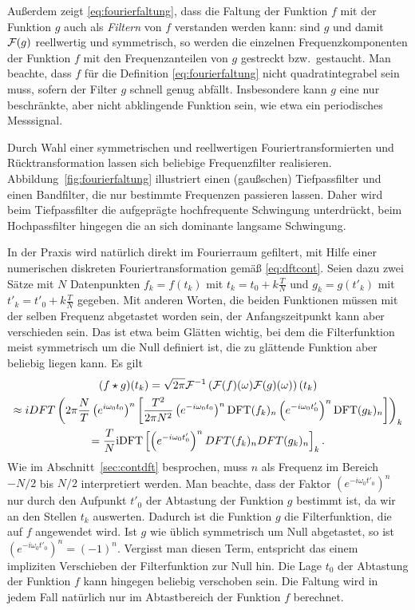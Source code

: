 Außerdem zeigt \eqref{eq:fourierfaltung}, dass die Faltung der Funktion
$f$ mit der Funktion $g$ auch als \emph{Filtern} von $f$ verstanden
werden kann:
sind $g$ und damit $\mathcal F(g)$ reellwertig und symmetrisch, so werden die
einzelnen Frequenzkomponenten der Funktion $f$ mit den
Frequenzanteilen von $g$ gestreckt bzw.\ gestaucht. Man beachte, dass $f$
für die Definition
\eqref{eq:fourierfaltung} nicht quadratintegrabel sein muss, sofern
der Filter $g$ schnell genug abfällt. Insbesondere kann $g$ eine nur
beschränkte, aber nicht abklingende Funktion sein, wie etwa ein periodisches
Messsignal.

Durch Wahl einer symmetrischen und reellwertigen
Fouriertransformierten und Rücktransformation lassen sich
beliebige Frequenzfilter realisieren. Abbildung~\ref{fig:fourierfaltung}
illustriert einen (gaußschen) Tiefpassfilter und einen Bandfilter, die
nur bestimmte Frequenzen passieren lassen. Daher wird beim
Tiefpassfilter die aufgeprägte hochfrequente Schwingung unterdrückt,
beim Hochpassfilter hingegen die an sich dominante langsame
Schwingung.

In der Praxis wird natürlich direkt im Fourierraum gefiltert, mit Hilfe einer
numerischen diskreten Fouriertransformation gemäß \eqref{eq:dftcont}. Seien dazu zwei Sätze mit $N$ Datenpunkten $f_k =
f(t_k)$  mit $t_k = t_0 + k\frac{T}{N}$  und $g_k = g(t'_k) $ mit
$t'_k = t'_0 + k\frac{T}{N}$ gegeben. Mit anderen Worten, die beiden
Funktionen müssen mit der selben Frequenz abgetastet worden sein, der
Anfangszeitpunkt kann aber verschieden sein. Das ist etwa beim
Glätten wichtig, bei dem die Filterfunktion meist symmetrisch um die
Null definiert ist, die zu glättende Funktion aber beliebig liegen
kann. Es gilt
\begin{multline}
  \label{eq:discretefold}
  (f\star g)(t_k) =
  \sqrt{2\pi}\mathcal F^{-1}\left(\mathcal F(f)(\omega)\mathcal F(g)(\omega)\right)(t_k)\\
  \approx
  iDFT\left(2\pi \frac{N}{T} \left(e^{i\omega_0 t_0}\right)^n
  \left[\frac{T^2}{2\pi N^2}\left(e^{-i\omega_0 t_0}\right)^n\text{DFT}(f_k)_n\left(e^{-i\omega_0 t'_0}\right)^n\text{DFT}(g_k)_n\right]\right)_k\\
  =
  \frac{T}{N} \text{iDFT}\left[\left(e^{-i\omega_0 t'_0}\right)^n DFT(f_k)_n DFT(g_k)_n\right]_k.
\end{multline}
Wie im Abschnitt~\ref{sec:contdft} besprochen, muss $n$ als Frequenz
im Bereich $-N/2$ bis $N/2$ interpretiert werden. Man beachte, dass
der Faktor $\left(e^{-i\omega_0 t'_0}\right)^n$ nur durch den Aufpunkt
$t'_0$ der Abtastung der Funktion $g$ bestimmt ist, da wir an den
Stellen $t_k$ auswerten. Dadurch ist die Funktion $g$ die
Filterfunktion, die auf $f$ angewendet wird. Ist $g$ wie üblich
symmetrisch um Null abgetastet, so ist $\left(e^{-i\omega_0
    t'_0}\right)^n=(-1)^n$. Vergisst man diesen Term, entspricht das
einem impliziten Verschieben der Filterfunktion zur Null hin.
Die Lage $t_0$ der Abtastung der Funktion $f$ kann hingegen beliebig
verschoben sein. Die Faltung wird in jedem Fall natürlich nur im
Abtastbereich der Funktion $f$ berechnet.

